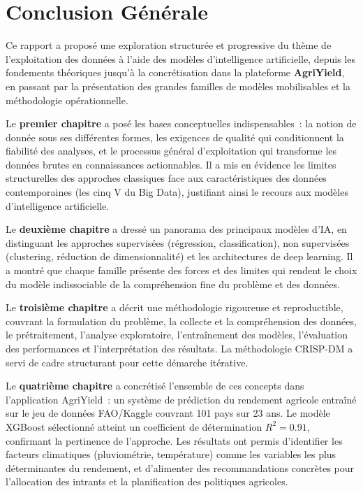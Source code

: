 \chapter*{Conclusion Générale}

Ce rapport a proposé une exploration structurée et progressive du thème de l'exploitation des données à l'aide des modèles d'intelligence artificielle, depuis les fondements théoriques jusqu'à la concrétisation dans la plateforme \textbf{AgriYield}, en passant par la présentation des grandes familles de modèles mobilisables et la méthodologie opérationnelle.

\bigskip
Le \textbf{premier chapitre} a posé les bases conceptuelles indispensables~: la notion de donnée sous ses différentes formes, les exigences de qualité qui conditionnent la fiabilité des analyses, et le processus général d'exploitation qui transforme les données brutes en connaissances actionnables. Il a mis en évidence les limites structurelles des approches classiques face aux caractéristiques des données contemporaines (les cinq V du Big Data), justifiant ainsi le recours aux modèles d'intelligence artificielle.

\bigskip
Le \textbf{deuxième chapitre} a dressé un panorama des principaux modèles d'IA, en distinguant les approches supervisées (régression, classification), non supervisées (clustering, réduction de dimensionnalité) et les architectures de deep learning. Il a montré que chaque famille présente des forces et des limites qui rendent le choix du modèle indissociable de la compréhension fine du problème et des données.

\bigskip
Le \textbf{troisième chapitre} a décrit une méthodologie rigoureuse et reproductible, couvrant la formulation du problème, la collecte et la compréhension des données, le prétraitement, l'analyse exploratoire, l'entraînement des modèles, l'évaluation des performances et l'interprétation des résultats. La méthodologie CRISP-DM a servi de cadre structurant pour cette démarche itérative.

\bigskip
Le \textbf{quatrième chapitre} a concrétisé l'ensemble de ces concepts dans l'application AgriYield~: un système de prédiction du rendement agricole entraîné sur le jeu de données FAO/Kaggle couvrant 101 pays sur 23 ans. Le modèle XGBoost sélectionné atteint un coefficient de détermination $R^2 = 0.91$, confirmant la pertinence de l'approche. Les résultats ont permis d'identifier les facteurs climatiques (pluviométrie, température) comme les variables les plus déterminantes du rendement, et d'alimenter des recommandations concrètes pour l'allocation des intrants et la planification des politiques agricoles.

